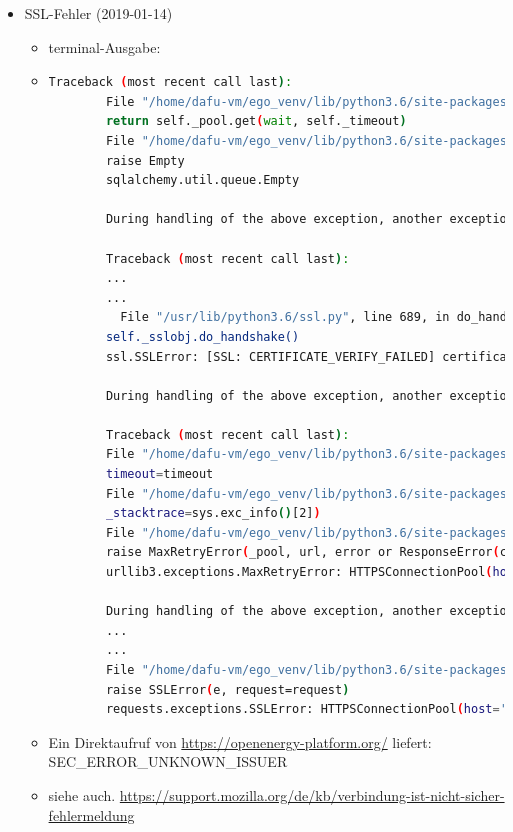 \documentclass[
a4paper,     %
12pt         %
]{scrartcl}  %
\begin{document}
\begin{itemize}
	\item SSL-Fehler (2019-01-14)
	\begin{itemize}
		\item terminal-Ausgabe:
		\item[] \begin{lstlisting}[language=bash]
		Traceback (most recent call last):
		File "/home/dafu-vm/ego_venv/lib/python3.6/site-packages/sqlalchemy/pool.py", line 1122, in _do_get
		return self._pool.get(wait, self._timeout)
		File "/home/dafu-vm/ego_venv/lib/python3.6/site-packages/sqlalchemy/util/queue.py", line 145, in get
		raise Empty
		sqlalchemy.util.queue.Empty

		During handling of the above exception, another exception occurred:

		Traceback (most recent call last):
		...
		...
		  File "/usr/lib/python3.6/ssl.py", line 689, in do_handshake
		self._sslobj.do_handshake()
		ssl.SSLError: [SSL: CERTIFICATE_VERIFY_FAILED] certificate verify failed (_ssl.c:847)

		During handling of the above exception, another exception occurred:

		Traceback (most recent call last):
		File "/home/dafu-vm/ego_venv/lib/python3.6/site-packages/requests/adapters.py", line 449, in send
		timeout=timeout
		File "/home/dafu-vm/ego_venv/lib/python3.6/site-packages/urllib3/connectionpool.py", line 638, in urlopen
		_stacktrace=sys.exc_info()[2])
		File "/home/dafu-vm/ego_venv/lib/python3.6/site-packages/urllib3/util/retry.py", line 398, in increment
		raise MaxRetryError(_pool, url, error or ResponseError(cause))
		urllib3.exceptions.MaxRetryError: HTTPSConnectionPool(host='openenergy-platform.org', port=443): Max retries exceeded with url: /api/v0/advanced/connection/open (Caused by SSLError(SSLError(1, '[SSL: CERTIFICATE_VERIFY_FAILED] certificate verify failed (_ssl.c:847)'),))

		During handling of the above exception, another exception occurred:
		...
		...
		File "/home/dafu-vm/ego_venv/lib/python3.6/site-packages/requests/adapters.py", line 514, in send
		raise SSLError(e, request=request)
		requests.exceptions.SSLError: HTTPSConnectionPool(host='openenergy-platform.org', port=443): Max retries exceeded with url: /api/v0/advanced/connection/open (Caused by SSLError(SSLError(1, '[SSL: CERTIFICATE_VERIFY_FAILED] certificate verify failed (_ssl.c:847)'),))


		\end{lstlisting}

		\item Ein Direktaufruf von \url{https://openenergy-platform.org/} liefert:\\ \textsc{SEC\_ERROR\_UNKNOWN\_ISSUER}\\
		\item siehe auch. \url{https://support.mozilla.org/de/kb/verbindung-ist-nicht-sicher-fehlermeldung}
	\end{itemize}
\end{itemize}
\end{document}
